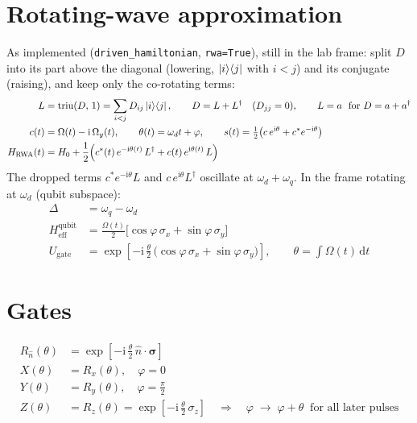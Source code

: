 \documentclass[11pt]{article}
\newcommand{\dd}{\mathrm{d}}
\newcommand{\ii}{\mathrm{i}}
\newcommand{\ad}{a^{\dagger}}
\begin{document}
\section*{Rotating-wave approximation}
As implemented (\texttt{driven\_hamiltonian}, \texttt{rwa=True}), still in the lab frame:
split $D$ into its part above the diagonal (lowering, $\ket{i}\!\bra{j}$ with $i<j$) and its
conjugate (raising), and keep only the co-rotating terms:
\begin{align}
  L &= \mathrm{triu}(D,\,1) = \sum_{i<j} D_{ij}\ket{i}\!\bra{j}, \qquad
  D = L + L^{\dagger} \quad (D_{jj} = 0), \qquad L = a \ \text{ for } D = a + \ad \\
  c(t) &= \Omega(t) - \ii\,\Omega_y(t), \qquad \theta(t) = \omega_d t + \varphi, \qquad
  s(t) = \tfrac12\big(c\,e^{\ii\theta} + c^{*}e^{-\ii\theta}\big) \\
  H_{\text{RWA}}(t) &= H_0 + \frac12\Big(c^{*}(t)\,e^{-\ii\theta(t)}\,L^{\dagger}
     + c(t)\,e^{\ii\theta(t)}\,L\Big)
\end{align}
The dropped terms $c^{*}e^{-\ii\theta}L$ and $c\,e^{\ii\theta}L^{\dagger}$ oscillate at
$\omega_d + \omega_q$. In the frame rotating at $\omega_d$ (qubit subspace):
\begin{align}
  \Delta &= \omega_q - \omega_d \\
  H_{\text{eff}}^{\text{qubit}} &= \frac{\Omega(t)}{2}\Big[\cos\varphi\,\sigma_x + \sin\varphi\,\sigma_y\Big] \\
  U_{\text{gate}} &= \exp\!\left[-\ii\,\frac{\theta}{2}\,\big(\cos\varphi\,\sigma_x + \sin\varphi\,\sigma_y\big)\right],
  \qquad \theta = \int \Omega(t)\,\dd t
\end{align}

\section*{Gates}
\begin{align}
  R_{\hat n}(\theta) &= \exp\!\left[-\ii\,\frac{\theta}{2}\,\hat n\cdot\bm{\sigma}\right] \\
  X(\theta) &= R_x(\theta), \quad \varphi = 0 \\
  Y(\theta) &= R_y(\theta), \quad \varphi = \tfrac{\pi}{2} \\
  Z(\theta) &= R_z(\theta) = \exp\!\left[-\ii\,\frac{\theta}{2}\,\sigma_z\right]
     \quad \Rightarrow \quad \varphi \;\to\; \varphi + \theta \ \text{ for all later pulses}
\end{align}
\end{document}
